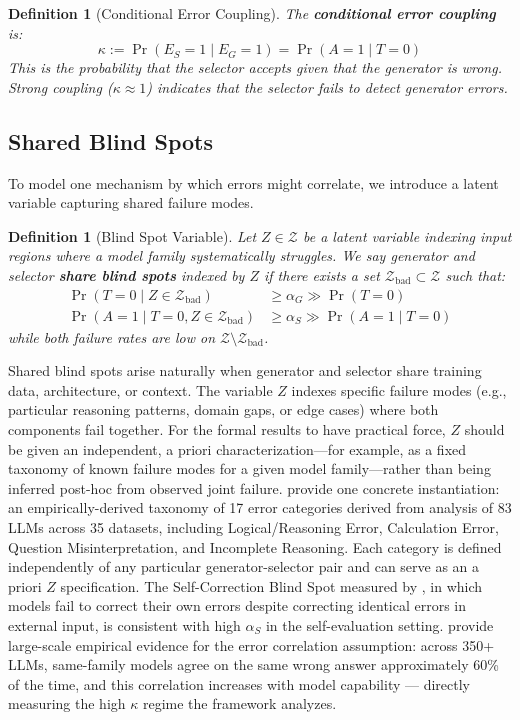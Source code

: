 \documentclass[11pt]{article}
\newtheorem{definition}[theorem]{Definition}
\begin{document}
\begin{definition}[Conditional Error Coupling]
The \textbf{conditional error coupling} is:
\begin{equation}
\kappa := \Pr(E_S = 1 \mid E_G = 1) = \Pr(A = 1 \mid T = 0)
\end{equation}
This is the probability that the selector accepts given that the generator is wrong. Strong
coupling ($\kappa \approx 1$) indicates that the selector fails to detect generator errors.
\end{definition}

\subsection{Shared Blind Spots}

To model one mechanism by which errors might correlate, we introduce a latent variable
capturing shared failure modes.

\begin{definition}[Blind Spot Variable]
Let $Z \in \mathcal{Z}$ be a latent variable indexing input regions where a model family
systematically struggles. We say generator and selector \textbf{share blind spots} indexed
by $Z$ if there exists a set $\mathcal{Z}_{\mathrm{bad}} \subset \mathcal{Z}$ such that:
\begin{align}
\Pr(T = 0 \mid Z \in \mathcal{Z}_{\mathrm{bad}}) &\geq \alpha_G \gg \Pr(T = 0) \\
\Pr(A = 1 \mid T = 0, Z \in \mathcal{Z}_{\mathrm{bad}}) &\geq \alpha_S \gg \Pr(A = 1 \mid T = 0)
\end{align}
while both failure rates are low on $\mathcal{Z} \setminus \mathcal{Z}_{\mathrm{bad}}$.
\end{definition}

Shared blind spots arise naturally when generator and selector share training data,
architecture, or context. The variable $Z$ indexes specific failure modes (e.g., particular
reasoning patterns, domain gaps, or edge cases) where both components fail together.
For the formal results to have practical force, $Z$ should be given an independent,
a priori characterization---for example, as a fixed taxonomy of known failure modes for
a given model family---rather than being inferred post-hoc from observed joint failure.
\citet{erroratlas2026} provide one concrete instantiation: an empirically-derived taxonomy
of 17 error categories derived from analysis of 83 LLMs across 35 datasets, including
Logical/Reasoning Error, Calculation Error, Question Misinterpretation, and Incomplete
Reasoning. Each category is defined independently of any particular generator-selector pair
and can serve as an a priori $Z$ specification. The Self-Correction Blind Spot measured
by \citet{tsui2025selfcorrection}, in which models fail to correct their own errors despite
correcting identical errors in external input, is consistent with high $\alpha_S$ in the
self-evaluation setting. \citet{kim2025correlated} provide large-scale empirical evidence
for the error correlation assumption: across 350+ LLMs, same-family models agree on the
same wrong answer approximately 60\% of the time, and this correlation increases with model
capability --- directly measuring the high $\kappa$ regime the framework analyzes.
\end{document}
